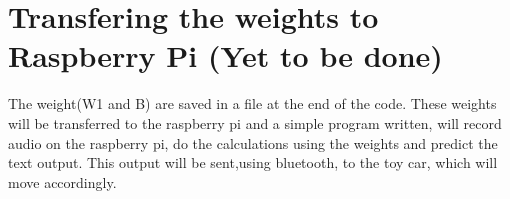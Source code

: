 \documentclass[journal,12pt,twocolumn]{IEEEtran}
\begin{document}
\section{Transfering the weights to Raspberry Pi (Yet to be done)}
The weight(W1 and B) are saved in a file at the end of the code. These weights will be transferred to the raspberry pi and a simple program written, will record audio on the raspberry pi, do the calculations using the weights and predict the text output. This output will be sent,using bluetooth, to the toy car, which will move accordingly.
\end{document}
